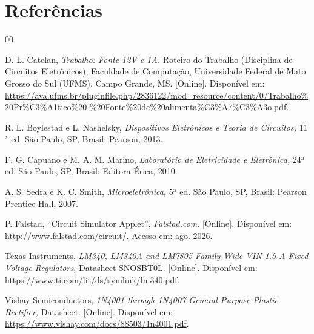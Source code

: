 \section*{Referências}

\begin{thebibliography}{00}

 D. L. Catelan, {\it Trabalho: Fonte 12V e 1A.} Roteiro do Trabalho (Disciplina de Circuitos Eletrônicos), Faculdade de Computação, Universidade Federal de Mato Grosso do Sul (UFMS), Campo Grande, MS. [Online]. Disponível em: \url{https://ava.ufms.br/pluginfile.php/2836122/mod_resource/content/0/Trabalho%20Pr%C3%A1tico%20-%20Fonte%20de%20alimenta%C3%A7%C3%A3o.pdf}.

 R. L. Boylestad e L. Nashelsky, {\it Dispositivos Eletrônicos e Teoria de Circuitos,} 11$^{\mathrm{a}}$ ed. São Paulo, SP, Brasil: Pearson, 2013.

 F. G. Capuano e M. A. M. Marino, {\it Laboratório de Eletricidade e Eletrônica,} 24$^{\mathrm{a}}$ ed. São Paulo, SP, Brasil: Editora Érica, 2010.

 A. S. Sedra e K. C. Smith, {\it Microeletrônica,} 5$^{\mathrm{a}}$ ed. São Paulo, SP, Brasil: Pearson Prentice Hall, 2007.

 P. Falstad, ``Circuit Simulator Applet'', {\it Falstad.com}. [Online]. Disponível em: \url{http://www.falstad.com/circuit/}. Acesso em: ago. 2026.

 Texas Instruments, {\it LM340, LM340A and LM7805 Family Wide VIN 1.5-A Fixed Voltage Regulators,} Datasheet SNOSBT0L. [Online]. Disponível em: \url{https://www.ti.com/lit/ds/symlink/lm340.pdf}.

 Vishay Semiconductors, {\it 1N4001 through 1N4007 General Purpose Plastic Rectifier,} Datasheet. [Online]. Disponível em: \url{https://www.vishay.com/docs/88503/1n4001.pdf}.

\end{thebibliography}
